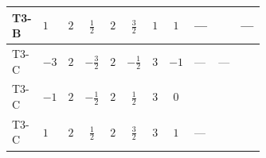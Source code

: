 \documentclass[8pt]{article}
\begin{document}
\begin{landscape}
\begin{longtable}{@{}llcccccc >{\raggedright\arraybackslash}p{0.21\linewidth} >{\raggedright\arraybackslash}p{0.21\linewidth} >{\raggedright\arraybackslash}p{0.21\linewidth}@{}}
\midrule
T3-B & $1$ & $2$ & $\frac{1}{2}$ & $2$ & $\frac{3}{2}$ & $1$ & $1$ & --- & \scriptsize\adjustbox{max width=\linewidth}{$\begin{gathered} +{g_1}^2 \left(18 {g_2}^2-15 {\lambda_{HS_2}^{(A)}}\right)\end{gathered}$} & --- \\
\midrule
T3-C & $-3$ & $2$ & $-\frac{3}{2}$ & $2$ & $-\frac{1}{2}$ & $3$ & $-1$ & --- & --- & \scriptsize\adjustbox{max width=\linewidth}{$\begin{gathered} {\lambda_{HS_2}^{(A)}} (3 T_{\nu}^{(2)}+6 \operatorname{Tr}\!\left({Y_d}\,\left({Y_d}\right)^{\dagger}\right)+2 \operatorname{Tr}\!\left({Y_e}\,\left({Y_e}\right)^{\dagger}\right)+6 \operatorname{Tr}\!\left({Y_u}\,\left({Y_u}\right)^{\dagger}\right))\end{gathered}$} \\
\midrule
T3-C & $-1$ & $2$ & $-\frac{1}{2}$ & $2$ & $\frac{1}{2}$ & $3$ & $0$ & \scriptsize\adjustbox{max width=\linewidth}{$\begin{gathered} +64 {\lambda_{8}} \left({\lambda_{8}}\right)^{*}\end{gathered}$} & \scriptsize\adjustbox{max width=\linewidth}{$\begin{gathered} +{g_1}^2 \left(6 {g_2}^2-3 {\lambda_{HS_2}^{(A)}}\right)\end{gathered}$} & \scriptsize\adjustbox{max width=\linewidth}{$\begin{gathered} {\lambda_{HS_2}^{(A)}} (3 T_{\nu}^{(2)}+6 \operatorname{Tr}\!\left({Y_d}\,\left({Y_d}\right)^{\dagger}\right)+2 \operatorname{Tr}\!\left({Y_e}\,\left({Y_e}\right)^{\dagger}\right)+6 \operatorname{Tr}\!\left({Y_u}\,\left({Y_u}\right)^{\dagger}\right))\end{gathered}$} \\
\midrule
T3-C & $1$ & $2$ & $\frac{1}{2}$ & $2$ & $\frac{3}{2}$ & $3$ & $1$ & --- & \scriptsize\adjustbox{max width=\linewidth}{$\begin{gathered} +{g_1}^2 \left(18 {g_2}^2-15 {\lambda_{HS_2}^{(A)}}\right)\end{gathered}$} & \scriptsize\adjustbox{max width=\linewidth}{$\begin{gathered} {\lambda_{HS_2}^{(A)}} (3 T_{\nu}^{(2)}+6 \operatorname{Tr}\!\left({Y_d}\,\left({Y_d}\right)^{\dagger}\right)+2 \operatorname{Tr}\!\left({Y_e}\,\left({Y_e}\right)^{\dagger}\right)+6 \operatorname{Tr}\!\left({Y_u}\,\left({Y_u}\right)^{\dagger}\right))\end{gathered}$} \\

\end{longtable}
\end{landscape}
\end{document}
